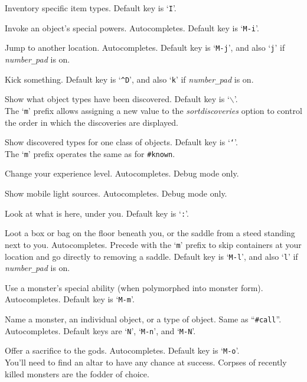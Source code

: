 Inventory specific item types. Default key is `{\tt I}'.
\item[\tb{\#invoke}]
Invoke an object's special powers. Autocompletes. Default key is `{\tt M-i}'.
\item[\tb{\#jump}]
Jump to another location. Autocompletes.
Default key is `{\tt M-j}',
and also `{\tt j}' if {\it number\verb+_+pad\/} is on.
\item[\tb{\#kick}]
Kick something.
Default key is `{\tt \^{}D}',
and also `{\tt k}' if {\it number\verb+_+pad\/} is on.
\item[\tb{\#known}]
Show what object types have been discovered.
Default key is `{\tt $\backslash$}'.
\\
The `{\tt m}' prefix allows assigning a new value to the
{\it sortdiscoveries\/}
option to control the order in which the discoveries are displayed.
\item[\tb{\#knownclass}]
Show discovered types for one class of objects.
Default key is `{\tt `}'.
\\
The `{\tt m}' prefix operates the same as for {\tt \#known}.
\item[\tb{\#levelchange}]
Change your experience level.
Autocompletes.
Debug mode only.
\item[\tb{\#lightsources}]
Show mobile light sources.
Autocompletes.
Debug mode only.
\item[\tb{\#look}]
Look at what is here, under you. Default key is `{\tt :}'.
\item[\tb{\#loot}]
Loot a box or bag on the floor beneath you, or the saddle
from a steed standing next to you. Autocompletes.
Precede with the `{\tt m}' prefix to skip containers at your location
and go directly to removing a saddle.
Default key is `{\tt M-l}',
and also `{\tt l}' if {\it number\verb+_+pad\/} is on.
\item[\tb{\#monster}]
Use a monster's special ability (when polymorphed into monster form).
Autocompletes. Default key is `{\tt M-m}'.
\item[\tb{\#name}]
Name a monster, an individual object, or a type of object.
Same as ``{\tt \#call}''.
Autocompletes.
Default keys are `{\tt N}', `{\tt M-n}', and `{\tt M-N}'.
\item[\tb{\#offer}]
Offer a sacrifice to the gods. Autocompletes. Default key is `{\tt M-o}'.\\
You'll need to find an altar to have any chance at success.
Corpses of recently killed monsters are the fodder of choice.
